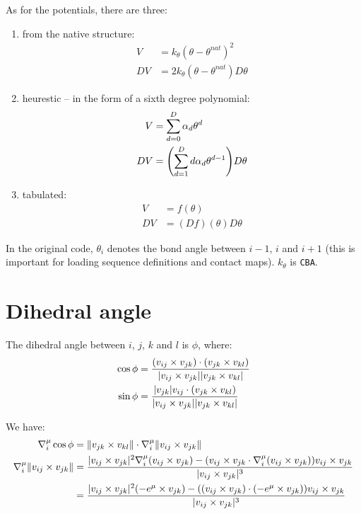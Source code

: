 \documentclass{article}
\DeclarePairedDelimiter{\p}{(}{)}
\DeclarePairedDelimiter{\norm}{\lvert}{\rvert}
\DeclarePairedDelimiter{\normed}{\lVert}{\rVert}
\newcommand{\cross}{\times}
\begin{document}
  As for the potentials, there are three:
  \begin{enumerate}
    \item from the native structure:
    \begin{align*}
      V &= k_\theta (\theta - \theta^{nat})^2\\
      DV &= 2k_\theta (\theta - \theta^{nat}) D\theta 
    \end{align*}

    \item heurestic -- in the form of a sixth degree polynomial:
    \begin{align*}
      V &= \sum_{d=0}^D \alpha_d \theta^d\\
      DV &= \p*{\sum_{d=1}^D d\alpha_d \theta^{d-1}}D\theta
    \end{align*}

    \item tabulated:
    \begin{align*}
      V &= f(\theta)\\
      DV &= (Df)(\theta) D\theta
    \end{align*}
  \end{enumerate}

  In the original code, $\theta_i$ denotes the bond angle between $i-1$, $i$ and $i+1$ (this is important for loading sequence definitions and contact maps). $k_\theta$ is {\tt CBA}.

  \section*{Dihedral angle}
  The dihedral angle between $i$, $j$, $k$ and $l$ is $\phi$, where:
  \begin{align*}
    \cos{\phi} &= \frac{(v_{ij} \cross v_{jk}) \cdot (v_{jk} \cross v_{kl})}{\norm{v_{ij} \cross v_{jk}} \norm{v_{jk} \cross v_{kl}}}\\
    \sin{\phi} &= \frac{\norm{v_{jk}}v_{ij} \cdot (v_{jk} \cross v_{kl})}{\norm{v_{ij} \cross v_{jk}} \norm{v_{jk} \cross v_{kl}}}
  \end{align*}

  We have:
  \newcommand{\crossA}{v_{ij} \cross v_{jk}}
  \newcommand{\crossB}{v_{jk} \cross v_{kl}}
  \begin{align*}
    \nabla_i^\mu \cos{\phi} &= \normed{\crossB} \cdot \nabla_i^\mu \normed{\crossA}\\
    \nabla_i^\mu \normed{\crossA} &= \frac{\norm{\crossA}^2\nabla_i^\mu(\crossA) - (\crossA \cdot \nabla_i^\mu(\crossA))\crossA}{\norm{\crossA}^3}\\
    &= \frac{\norm{\crossA}^2 (-e^\mu \cross v_{jk}) - ((\crossA) \cdot (-e^\mu \cross v_{jk}))\crossA}{\norm{\crossA}^3}
  \end{align*}
\end{document}
